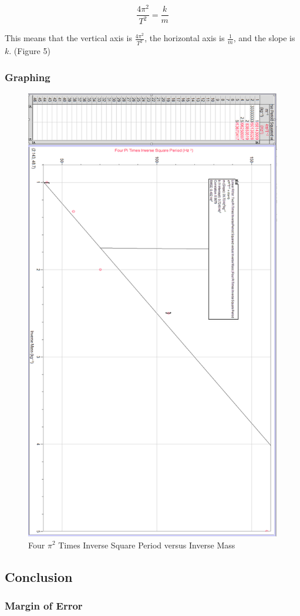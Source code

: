 \documentclass{article}
\begin{document}
$$\frac{4\pi^2}{T^2}=\frac{k}{m}$$

This means that the vertical axis is $\frac{4\pi^2}{T^2}$, the horizontal axis is $\frac{1}{m}$, and the slope is $k$. (Figure 5)

\subsubsection{Graphing}

\begin{figure}[H]
\centering
    \includegraphics[width=.75\columnwidth]{Slide1}
    \caption{Four $\pi^2$ Times Inverse Square Period versus Inverse Mass }
\end{figure}

\newpage
\subsection{Conclusion}

\subsubsection{Margin of Error}
\end{document}
